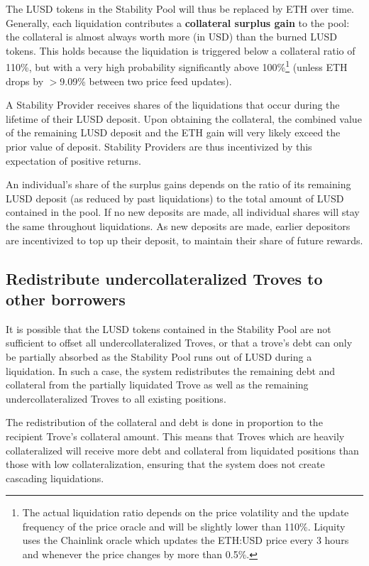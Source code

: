\documentclass{article}
\begin{document}
The LUSD tokens in the Stability Pool will thus be replaced by ETH over time. Generally, each liquidation contributes a \textbf{collateral surplus gain} to the pool: the collateral is almost always worth more (in USD) than the burned LUSD tokens. This holds because the liquidation is triggered below a collateral ratio of 110\%, but with a very high probability significantly above 100\%\footnote{The actual liquidation ratio depends on the price volatility and the update frequency of the price oracle and will be slightly lower than 110\%. Liquity uses the Chainlink oracle which updates the ETH:USD price every 3 hours and whenever the price changes by more than 0.5\%.} (unless ETH drops by $>$9.09\% between two price feed updates).

A Stability Provider receives shares of the liquidations that occur during the lifetime of their LUSD deposit. Upon obtaining the collateral, the combined value of the remaining LUSD deposit and the ETH gain will very likely exceed the prior value of deposit. Stability Providers are thus incentivized by this expectation of positive returns.

An individual’s share of the surplus gains depends on the ratio of its remaining LUSD deposit (as reduced by past liquidations) to the total amount of LUSD contained in the pool. If no new deposits are made, all individual shares will stay the same throughout liquidations. As new deposits are made, earlier depositors are incentivized to top up their deposit, to maintain their share of future rewards.

\subsection{Redistribute undercollateralized Troves to other borrowers}
It is possible that the LUSD tokens contained in the Stability Pool are not sufficient to offset all undercollateralized Troves, or that a trove’s debt can only be partially absorbed as the Stability Pool runs out of LUSD during a liquidation. In such a case, the system redistributes the remaining debt and collateral from the partially liquidated Trove as well as the remaining undercollateralized Troves to all existing positions.

The redistribution of the collateral and debt is done in proportion to the recipient Trove’s collateral amount. This means that Troves which are heavily collateralized will receive more debt and collateral from liquidated positions than those with low collateralization, ensuring that the system does not create cascading liquidations.\\
\end{document}
